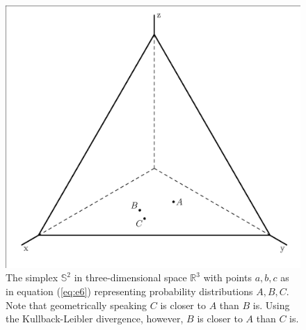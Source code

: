 \documentclass[12pt]{article}
\begin{document}
\begin{figure}[ht]
  \begin{flushright}
    \begin{minipage}[h]{.7\linewidth}
      \includegraphics[width=\textwidth]{threepoints.eps}
      \caption{\footnotesize The simplex $\mathbb{S}^{2}$ in
        three-dimensional space $\mathbb{R}^{3}$ with points $a,b,c$
        as in equation (\ref{eq:e6}) representing probability
        distributions $A,B,C$. Note that geometrically speaking $C$ is
        closer to $A$ than $B$ is. Using the Kullback-Leibler
        divergence, however, $B$ is closer to $A$ than $C$ is.}
      \label{fig:threepoints}
    \end{minipage}
  \end{flushright}
\end{figure}
\end{document}
